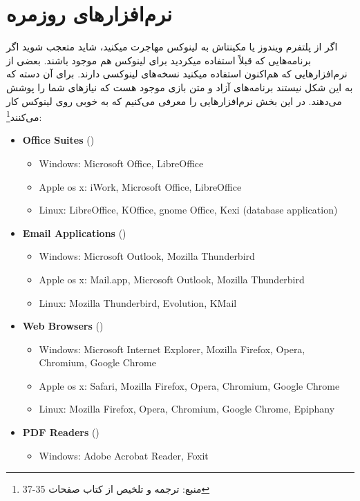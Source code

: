 \section{نرم‌افزارهای روزمره}
اگر از پلتفرم ویندوز یا مکینتاش به لینوکس مهاجرت میکنید، شاید متعجب شوید اگر برنامه‌هایی که قبلاً استفاده میکردید برای لینوکس هم موجود باشند. بعضی از نرم‌افزارهایی که هم‌اکنون استفاده میکنید نسخه‌های لینوکسی دارند. برای آن دسته که به این شکل نیستند برنامه‌های آزاد و متن بازی موجود هست که نیازهای شما را پوشش می‌دهند. در این بخش نرم‌افزارهایی را معرفی می‌کنیم که به خوبی روی لینوکس کار می‌کنند\footnote{
	منبع:
	ترجمه و تلخیص از کتاب
	صفحات 35-37
}:
\begin{eng}
	\begin{itemize}
		\item \textbf{Office Suites} ()
		\begin{itemize}
			\item Windows: Microsoft Office, LibreOffice
			\item Apple os x: iWork, Microsoft Office, LibreOffice
			\item Linux: LibreOffice, KOffice, gnome Office, Kexi (database application)
		\end{itemize}
		\item \textbf{Email Applications} ()
		\begin{itemize}
			\item Windows: Microsoft Outlook, Mozilla Thunderbird
			\item Apple os x: Mail.app, Microsoft Outlook, Mozilla Thunderbird
			\item Linux: Mozilla Thunderbird, Evolution, KMail
		\end{itemize}
		\item \textbf{Web Browsers} ()
		\begin{itemize}
			\item Windows: Microsoft Internet Explorer, Mozilla Firefox, Opera, Chromium, Google Chrome
			\item Apple os x: Safari, Mozilla Firefox, Opera, Chromium, Google Chrome
			\item Linux: Mozilla Firefox, Opera, Chromium, Google Chrome, Epiphany
		\end{itemize}
		\item \textbf{PDF Readers} ()
		\begin{itemize}
			\item Windows: Adobe Acrobat Reader, Foxit

\end{itemize}
\end{itemize}
\end{eng}
